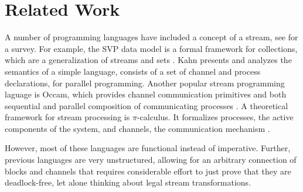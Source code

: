 \section{Related Work}
\label{sec:related}
A number of programming languages have included a concept of a stream,
see \cite{survey97} for a survey.  
For example, the SVP data model is a formal framework for collections,
which are a generalization of streams and sets \cite{Par92}.  Kahn
presents and analyzes the semantics of a simple language, consists of
a set of channel and process declarations, for parallel
programming\cite{Kah74}.  Another popular stream programming laguage
is Occam, which provides channel communication primitives and both
sequential and parallel composition of communicating processes
\cite{Jif93}.  A theoretical framework for stream processing is
$\pi$-calculus.  It formalizes processes, the active components of the
system, and channels, the communication mechanism
\cite{Pie97}. 

However, most of these languages are functional instead of imperative.
Further, previous languages are very unstructured, allowing for an
arbitrary connection of blocks and channels that requires considerable
effort to just prove that they are deadlock-free, let alone thinking
about legal stream transformations.

